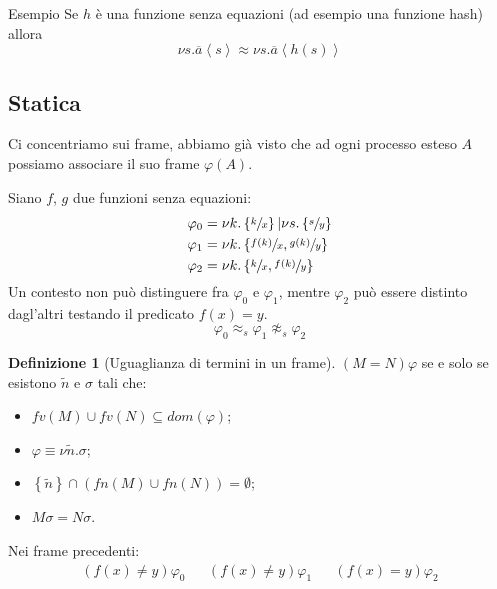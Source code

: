 \documentclass{beamer}
\newcounter{counter1}
\theoremstyle{plain}
\theoremstyle{definition}
\newtheorem{mydef}[counter1]{Definizione}
\theoremstyle{remark}
\newcommand{\obar}[1]{\overline{#1}}
\newcommand{\set}[1]{\left\{#1\right\}}
\newcommand{\ang}[1]{\left<#1\right>}
\begin{document}
\begin{frame}{Esempio}
  Se $h$ \`e una funzione senza equazioni (ad esempio una funzione
  hash) allora
  \[ \nu s. \obar{a}\ang{s} \approx \nu s. \obar{a}\ang{h(s)} \]
\end{frame}

\subsection{Statica}

\begin{frame}
  Ci concentriamo sui frame, abbiamo gi\`a visto che ad ogni processo
  esteso $A$ possiamo associare il suo frame $\varphi (A)$.
  \vfill
  
  Siano $f$, $g$ due funzioni senza equazioni:
  \begin{align*}
    \varphi _0 &= \nu k.\set{\sfrac{k}{x}} | \nu s. \set{\sfrac{s}{y}}
    \\
    \varphi _1 &= \nu k.\set{ \sfrac{f(k)}{x}, \sfrac{g(k)}{y}} \\
    \varphi _2 &= \nu k.\set{ \sfrac{k}{x}, \sfrac{f(k)}{y}} 
  \end{align*}
  Un contesto non pu\`o distinguere fra $\varphi _0$ e $\varphi _1$,
  mentre $\varphi _2$ pu\`o essere distinto dagl'altri testando il
  predicato $f(x) = y$.
  \[ \varphi _0 \approx _s \varphi _1 \not \approx _s \varphi _2 \]
\end{frame}

\begin{frame}
  \begin{mydef}[Uguaglianza di termini in un frame]
    $(M=N)\varphi$ se e solo se esistono $\tilde n$ e $\sigma$ tali che:
    \begin{itemize}
    \item $fv(M) \cup fv(N) \subseteq dom(\varphi)$;
    \item $\varphi \equiv \nu \tilde n.\sigma$;
    \item $\set{\tilde n} \cap( fn(M) \cup fn(N)) = \emptyset$;
    \item $M\sigma = N\sigma$.
    \end{itemize}
  \end{mydef}
  \vfill
  
  Nei frame precedenti:
  \begin{align*}
    (f(x) \neq y)\varphi _0 && (f(x) \neq y)\varphi _1 && (f(x) =
                                                        y)\varphi _2
  \end{align*}
\end{frame}
\end{document}
